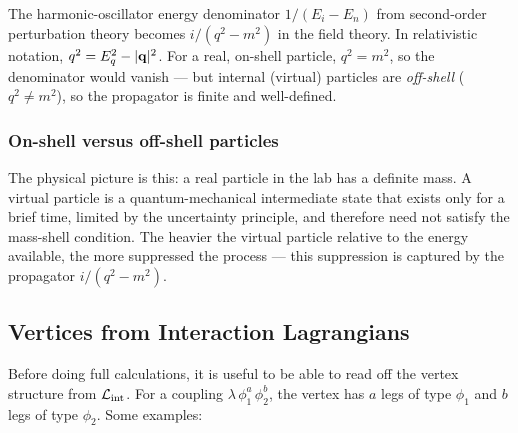 \documentclass[../main.tex]{subfiles}
\begin{document}
\begin{remark}
The harmonic-oscillator energy denominator $1/(E_i - E_n)$ from second-order perturbation theory becomes $i/(q^2 - m^2)$ in the field theory.  In relativistic notation, $q^2 = E_q^2 - |\mathbf{q}|^2$.  For a real, on-shell particle, $q^2 = m^2$, so the denominator would vanish — but internal (virtual) particles are \emph{off-shell} ($q^2 \neq m^2$), so the propagator is finite and well-defined.
\end{remark}

\subsubsection*{On-shell versus off-shell particles}


The physical picture is this: a real particle in the lab has a definite mass.  A virtual particle is a quantum-mechanical intermediate state that exists only for a brief time, limited by the uncertainty principle, and therefore need not satisfy the mass-shell condition.  The heavier the virtual particle relative to the energy available, the more suppressed the process — this suppression is captured by the propagator $i/(q^2 - m^2)$.

\subsection*{Vertices from Interaction Lagrangians}

Before doing full calculations, it is useful to be able to read off the vertex structure from $\mathcal{L}_{\rm int}$.  For a coupling $\lambda\,\phi_1^a\,\phi_2^b$, the vertex has $a$ legs of type $\phi_1$ and $b$ legs of type $\phi_2$.  Some examples:
\end{document}
